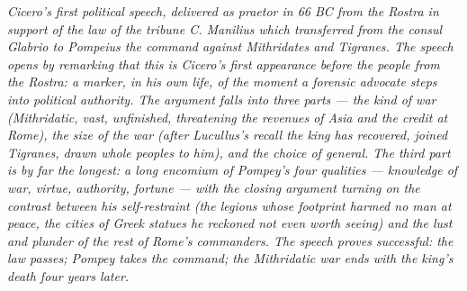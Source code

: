 
\textit{Cicero's first political speech, delivered as praetor in
66 BC from the Rostra in support of the law of the tribune
C. Manilius which transferred from the consul Glabrio to Pompeius
the command against Mithridates and Tigranes. The speech opens by
remarking that this is Cicero's first appearance before the people
from the Rostra: a marker, in his own life, of the moment a
forensic advocate steps into political authority. The argument
falls into three parts --- the kind of war (Mithridatic, vast,
unfinished, threatening the revenues of Asia and the credit at
Rome), the size of the war (after Lucullus's recall the king has
recovered, joined Tigranes, drawn whole peoples to him), and the
choice of general. The third part is by far the longest: a long
encomium of Pompey's four qualities --- knowledge of war, virtue,
authority, fortune --- with the closing argument turning on the
contrast between his self-restraint (the legions whose footprint
harmed no man at peace, the cities of Greek statues he reckoned
not even worth seeing) and the lust and plunder of the rest of
Rome's commanders. The speech proves successful: the law passes;
Pompey takes the command; the Mithridatic war ends with the king's
death four years later.}
